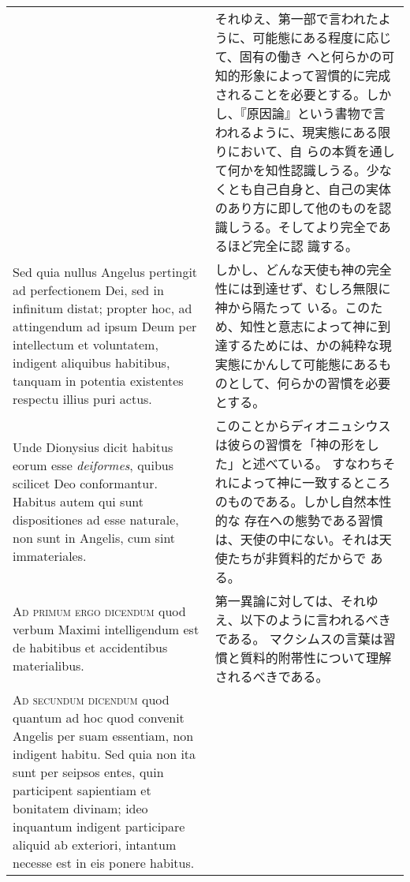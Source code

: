 \documentclass[10pt]{jsarticle} %
\begin{document}
\begin{longtable}{p{21em}p{21em}}
&

それゆえ、第一部で言われたように、可能態にある程度に応じて、固有の働き
へと何らかの可知的形象によって習慣的に完成されることを必要とする。しか
し、『原因論』という書物で言われるように、現実態にある限りにおいて、自
らの本質を通して何かを知性認識しうる。少なくとも自己自身と、自己の実体
のあり方に即して他のものを認識しうる。そしてより完全であるほど完全に認
識する。

\\


Sed quia nullus Angelus pertingit ad perfectionem Dei, sed in
infinitum distat; propter hoc, ad attingendum ad ipsum Deum per
intellectum et voluntatem, indigent aliquibus habitibus, tanquam in
potentia existentes respectu illius puri actus.

&

しかし、どんな天使も神の完全性には到達せず、むしろ無限に神から隔たって
 いる。このため、知性と意志によって神に到達するためには、かの純粋な現
 実態にかんして可能態にあるものとして、何らかの習慣を必要とする。

\\


Unde Dionysius dicit habitus eorum esse {\itshape deiformes}, quibus
 scilicet Deo conformantur. Habitus autem qui sunt dispositiones ad
 esse naturale, non sunt in Angelis, cum sint immateriales.

&

このことからディオニュシウスは彼らの習慣を「神の形をした」と述べている。
すなわちそれによって神に一致するところのものである。しかし自然本性的な
 存在への態勢である習慣は、天使の中にない。それは天使たちが非質料的だからで
 ある。

\\



{\scshape Ad primum ergo dicendum} quod verbum Maximi intelligendum est de
 habitibus et accidentibus materialibus.


&

第一異論に対しては、それゆえ、以下のように言われるべきである。
マクシムスの言葉は習慣と質料的附帯性について理解されるべきである。


\\


{\scshape Ad secundum dicendum} quod quantum ad hoc quod convenit Angelis per
 suam essentiam, non indigent habitu. Sed quia non ita sunt per
 seipsos entes, quin participent sapientiam et bonitatem divinam; ideo
 inquantum indigent participare aliquid ab exteriori, intantum necesse
 est in eis ponere habitus.


\end{longtable}
\end{document}
